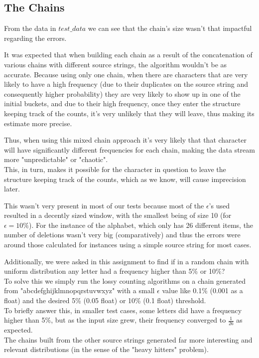 \documentclass[...]{revdetua}
\begin{document}
\subsection{The Chains}
From the data in $test\_data$ we can see that the chain's size wasn't that impactful regarding the errors.\par
It was expected that when building each chain as a result of the concatenation of various chains with different source strings, the algorithm wouldn't be as accurate. Because using only one chain, when there are characters that are very likely to have a high frequency (due to their duplicates on the source string and consequently higher probability) they are very likely to show up in one of the initial buckets, and due to their high frequency, once they enter the structure keeping track of the counts, it's very unlikely that they will leave, thus making its estimate more precise.\par 
Thus, when using this mixed chain approach it's very likely that that character will have significantly different frequencies for each chain, making the data stream more "unpredictable" or "chaotic". \\This, in turn, makes it possible for the character in question to leave the structure keeping track of the counts, which as we know, will cause imprecision later.\par
This wasn't very present in most of our tests because most of the $\epsilon$'s used resulted in a decently sized window, with the smallest being of size 10 (for $\epsilon=10\%$). For the instance of the alphabet, which only has 26 different items, the number of deletions wasn't very big (comparatively) and thus the errors were around those calculated for instances using  a simple source string for most cases.\par
Additionally, we were asked in this assignment to find if in a random chain with uniform distribution any letter had a frequency higher than 5\% or 10\%?\\
To solve this we simply run the lossy counting algorithms on a chain generated from "abcdefghijklmnopqrstuvwxyz" with a small $\epsilon$ value like 0.1\% (0.001 as a float) and the desired 5\% (0.05 float) or 10\% (0.1 float) threshold.\\
To briefly answer this, in smaller test cases, some letters did have a frequency higher than 5\%, but as the input size grew, their frequency converged to $\frac{1}{26}$ as expected.\\
The chains built from the other source strings generated far more interesting and relevant distributions (in the sense of the "heavy hitters" problem). 
\end{document}
